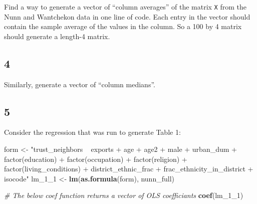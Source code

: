 \documentclass[
]{book}
\newenvironment{Shaded}{\begin{snugshade}}{\end{snugshade}}
\newcommand{\CommentTok}[1]{\textcolor[rgb]{0.56,0.35,0.01}{\textit{#1}}}
\newcommand{\DecValTok}[1]{\textcolor[rgb]{0.00,0.00,0.81}{#1}}
\newcommand{\KeywordTok}[1]{\textcolor[rgb]{0.13,0.29,0.53}{\textbf{#1}}}
\newcommand{\NormalTok}[1]{#1}
\newcommand{\StringTok}[1]{\textcolor[rgb]{0.31,0.60,0.02}{#1}}
\theoremstyle{definition}
\theoremstyle{definition}
\theoremstyle{definition}
\theoremstyle{definition}
\theoremstyle{remark}
\begin{document}
Find a way to generate a vector of ``column averages'' of the matrix \texttt{X} from the Nunn and Wantchekon data in one line of code. Each entry in the vector should contain the sample average of the values in the column. So a 100 by 4 matrix should generate a length-4 matrix.

\hypertarget{section-9}{%
\subsection*{4}\label{section-9}}

Similarly, generate a vector of ``column medians''.

\hypertarget{section-10}{%
\subsection*{5}\label{section-10}}

Consider the regression that was run to generate Table 1:

\begin{Shaded}
\begin{Highlighting}[]
\NormalTok{form <-}\StringTok{ "trust_neighbors ~ exports + age + age2 +  male + urban_dum + factor(education) + factor(occupation) + factor(religion) + factor(living_conditions) + district_ethnic_frac + frac_ethnicity_in_district + isocode"}
\NormalTok{lm_}\DecValTok{1}\NormalTok{_}\DecValTok{1}\NormalTok{ <-}\StringTok{ }\KeywordTok{lm}\NormalTok{(}\KeywordTok{as.formula}\NormalTok{(form), nunn_full)}

\CommentTok{# The below coef function returns a vector of OLS coefficiants}
\KeywordTok{coef}\NormalTok{(lm_}\DecValTok{1}\NormalTok{_}\DecValTok{1}\NormalTok{)}
\end{Highlighting}
\end{Shaded}
\end{document}
